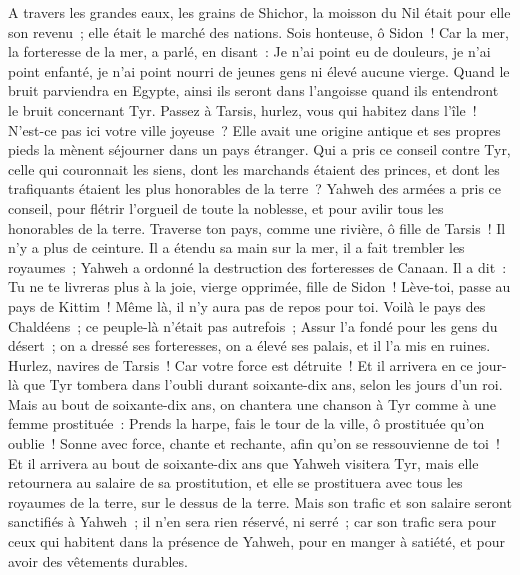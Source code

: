 \begin{multicols}{2}
A travers les grandes eaux, les grains de Shichor, la moisson du Nil était pour elle son revenu~; elle était le marché des nations.
Sois honteuse, ô Sidon~! Car la mer, la forteresse de la mer, a parlé, en disant~: Je n'ai point eu de douleurs, je n'ai point enfanté, je n'ai point nourri de jeunes gens ni élevé aucune vierge.
Quand le bruit parviendra en Egypte, ainsi ils seront dans l'angoisse quand ils entendront le bruit concernant Tyr.
Passez à Tarsis, hurlez, vous qui habitez dans l'île~!
N'est-ce pas ici votre ville joyeuse~? Elle avait une origine antique et ses propres pieds la mènent séjourner dans un pays étranger.
Qui a pris ce conseil contre Tyr, celle qui couronnait les siens, dont les marchands étaient des princes, et dont les trafiquants étaient les plus honorables de la terre~?
Yahweh des armées a pris ce conseil, pour flétrir l'orgueil de toute la noblesse, et pour avilir tous les honorables de la terre.
Traverse ton pays, comme une rivière, ô fille de Tarsis~! Il n'y a plus de ceinture.
Il a étendu sa main sur la mer, il a fait trembler les royaumes~; Yahweh a ordonné la destruction des forteresses de Canaan.
Il a dit~: Tu ne te livreras plus à la joie, vierge opprimée, fille de Sidon~! Lève-toi, passe au pays de Kittim~! Même là, il n'y aura pas de repos pour toi.
Voilà le pays des Chaldéens~; ce peuple-là n'était pas autrefois~; Assur l'a fondé pour les gens du désert~; on a dressé ses forteresses, on a élevé ses palais, et il l'a mis en ruines.
Hurlez, navires de Tarsis~! Car votre force est détruite~!
Et il arrivera en ce jour-là que Tyr tombera dans l'oubli durant soixante-dix ans, selon les jours d'un roi. Mais au bout de soixante-dix ans, on chantera une chanson à Tyr comme à une femme prostituée~:
Prends la harpe, fais le tour de la ville, ô prostituée qu'on oublie~! Sonne avec force, chante et rechante, afin qu'on se ressouvienne de toi~!
Et il arrivera au bout de soixante-dix ans que Yahweh visitera Tyr, mais elle retournera au salaire de sa prostitution, et elle se prostituera avec tous les royaumes de la terre, sur le dessus de la terre.
Mais son trafic et son salaire seront sanctifiés à Yahweh~; il n'en sera rien réservé, ni serré~; car son trafic sera pour ceux qui habitent dans la présence de Yahweh, pour en manger à satiété, et pour avoir des vêtements durables.

\end{multicols}
